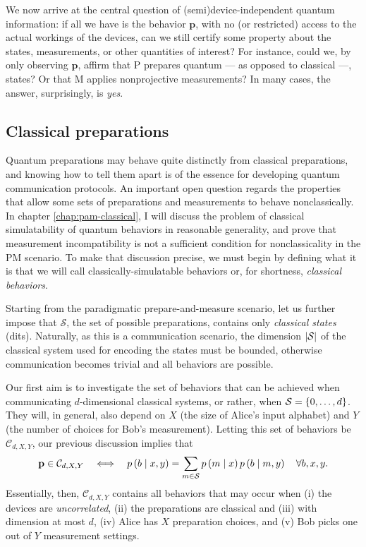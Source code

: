         We now arrive at the central question of (semi)device-independent quantum information: if all we have is the behavior $\mathbf{p}$, with no (or restricted) access to the actual workings of the devices, can we still certify some property about the states, measurements, or other quantities of interest? For instance, could we, by only observing $\mathbf{p}$, affirm that P prepares quantum --- as opposed to classical ---, states? Or that M applies nonprojective measurements? In many cases, the answer, surprisingly, is \emph{yes}.
    
        \subsection{Classical preparations}

            Quantum preparations may behave quite distinctly from classical preparations, and knowing how to tell them apart is of the essence for developing quantum communication protocols. An important open question regards the properties that allow some sets of preparations and measurements to behave nonclassically. In chapter \ref{chap:pam-classical}, I will discuss the problem of classical simulatability of quantum behaviors in reasonable generality, and prove that measurement incompatibility is not a sufficient condition for nonclassicality in the PM scenario. To make that discussion precise, we must begin by defining what it is that we will call classically-simulatable behaviors or, for shortness, \emph{classical behaviors}.
        
            Starting from the paradigmatic prepare-and-measure scenario, let us further impose that $\mathcal{S}$, the set of possible preparations, contains only \emph{classical states} (dits). Naturally, as this is a communication scenario, the dimension $\abs{\mathcal{S}}$ of the classical system used for encoding the states must be bounded, otherwise communication becomes trivial and all behaviors are possible.
            
            Our first aim is to investigate the set of behaviors that can be achieved when communicating $d$-dimensional classical systems, or rather, when  $\mathcal{S} = \{ 0, \ldots, d \}$. They will, in general, also depend on $X$ (the size of Alice's input alphabet) and $Y$ (the number of choices for Bob's measurement). Letting this set of behaviors be $\mathcal{C}_{d,X,Y}$, our previous discussion implies that
            \begin{equation}
                \mathbf{p} \in \mathcal{C}_{d,X,Y} \quad\Longleftrightarrow \quad p \left( b \mid x,y \right) = \sum_{m \in \mathcal{S}} p \left( m \mid x \right) p \left( b \mid m,y \right) \quad\forall b,x,y .
                \label{eq:pam-classical-independent}
            \end{equation}
            Essentially, then, $\mathcal{C}_{d,X,Y}$ contains all behaviors that may occur when (i) the devices are \emph{uncorrelated}, (ii) the preparations are classical and (iii) with dimension at most $d$, (iv) Alice has $X$ preparation choices, and (v) Bob picks one out of $Y$ measurement settings.
            
